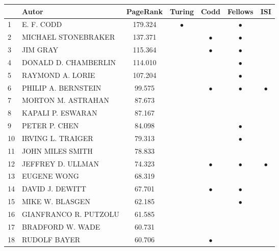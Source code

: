 \documentclass[12pt,titlepage]{report}
\begin{document}
\begin{center}
\begin{tabular}{|l|l|c|c|c|c|c|}
\hline
& {\bf Autor} & {\bf PageRank} & {\bf Turing} & {\bf Codd} & {\bf Fellows} & {\bf ISI} \\
\hline
1 & E. F. CODD & 179.324            & $\bullet$ &           & $\bullet$ &           \\
\hline
2 & MICHAEL STONEBRAKER & 137.371   &           & $\bullet$ & $\bullet$ &           \\
\hline
3 & JIM GRAY & 115.364              &           & $\bullet$ & $\bullet$ &           \\
\hline
4 & DONALD D. CHAMBERLIN & 114.010  &           &           & $\bullet$ &           \\
\hline
5 & RAYMOND A. LORIE & 107.204      &           &           & $\bullet$ &           \\
\hline
6 & PHILIP A. BERNSTEIN & 99.575    &           & $\bullet$ & $\bullet$ & $\bullet$ \\
\hline
7 & MORTON M. ASTRAHAN & 87.673     &           &           &           &           \\
\hline
8 & KAPALI P. ESWARAN & 87.167      &           &           &           &           \\
\hline
9 & PETER P. CHEN & 84.098          &           &           & $\bullet$ &           \\
\hline
10 & IRVING L. TRAIGER & 79.313     &           &           & $\bullet$ &           \\
\hline
11 & JOHN MILES SMITH & 78.833      &           &           &           &           \\
\hline
12 & JEFFREY D. ULLMAN & 74.323     &           & $\bullet$ & $\bullet$ & $\bullet$ \\
\hline
13 & EUGENE WONG & 68.319           &           &           &           &           \\
\hline
14 & DAVID J. DEWITT & 67.701       &           & $\bullet$ & $\bullet$ &           \\
\hline
15 & MIKE W. BLASGEN & 62.185       &           &           & $\bullet$ &           \\
\hline
16 & GIANFRANCO R. PUTZOLU & 61.585 &           &           &           &           \\
\hline
17 & BRADFORD W. WADE & 60.731      &           &           &           &           \\
\hline
18 & RUDOLF BAYER & 60.706          &           & $\bullet$ &           &           \\

\end{tabular}
\end{center}
\end{document}
